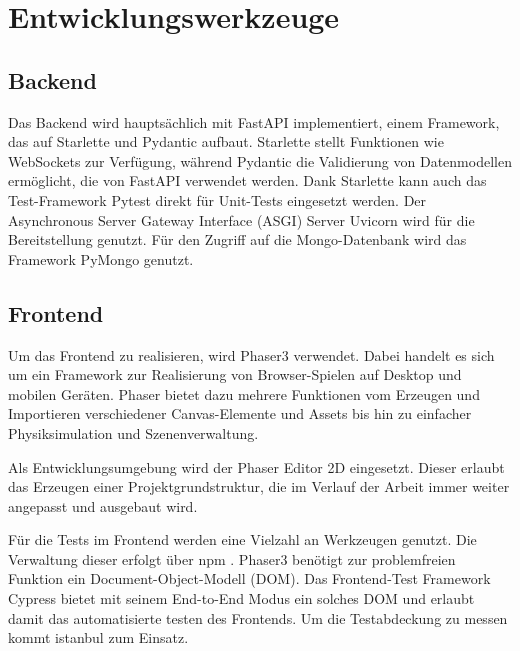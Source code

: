 \documentclass[a4paper, 10pt, conference]{IEEEtran}
\begin{document}
\section{Entwicklungswerkzeuge}\label{sec:entwicklungswerkzeuge}



\subsection{Backend}\label{subsec:backend-dev-tools}
Das Backend wird hauptsächlich mit FastAPI implementiert, einem Framework, das auf Starlette \cite{starlette} und Pydantic \cite{pydantic} aufbaut. Starlette stellt Funktionen wie WebSockets zur Verfügung, während Pydantic die Validierung von Datenmodellen ermöglicht, die von FastAPI verwendet werden. Dank Starlette kann auch das Test-Framework Pytest \cite{pytest} direkt für Unit-Tests eingesetzt werden. Der Asynchronous Server Gateway Interface (ASGI) Server Uvicorn \cite{uvicorn} wird für die Bereitstellung genutzt. Für den Zugriff auf die Mongo-Datenbank wird das Framework PyMongo \cite{pymongo} genutzt. 




\subsection{Frontend}\label{subsec:frontend-dev-tools}

Um das Frontend zu realisieren, wird Phaser3 \cite{phaser} verwendet. Dabei handelt es sich um ein Framework zur Realisierung von Browser-Spielen auf Desktop und mobilen Geräten. Phaser bietet dazu mehrere Funktionen vom Erzeugen und Importieren verschiedener Canvas-Elemente und Assets bis hin zu einfacher Physiksimulation und Szenenverwaltung.

Als Entwicklungsumgebung wird der Phaser Editor 2D eingesetzt. Dieser erlaubt das Erzeugen einer Projektgrundstruktur, die im Verlauf der Arbeit immer weiter angepasst und ausgebaut wird.  

Für die Tests im Frontend werden eine Vielzahl an Werkzeugen genutzt. Die Verwaltung dieser erfolgt über npm \cite{npm}. Phaser3 benötigt zur problemfreien Funktion ein Document-Object-Modell (DOM). Das Frontend-Test Framework Cypress \cite{cypress} bietet mit seinem End-to-End Modus ein solches DOM und erlaubt damit das automatisierte testen des Frontends. Um die Testabdeckung zu messen kommt istanbul \cite{istanbul} zum Einsatz.
\end{document}
